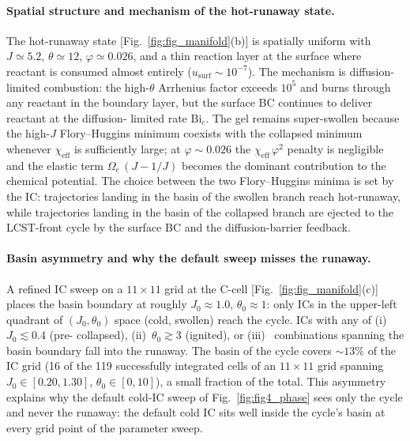 \documentclass[aps,pre,reprint,superscriptaddress,longbibliography,floatfix]{revtex4-2}
\newcommand{\Bi}{\mathrm{Bi}}
\begin{document}
\paragraph{Spatial structure and mechanism of the hot-runaway state.}
The hot-runaway state [Fig.~\ref{fig:fig_manifold}(b)] is spatially
uniform with $J\!\simeq\!5.2$, $\theta\!\simeq\!12$,
$\varphi\!\simeq\!0.026$, and a thin reaction layer at the surface
where reactant is consumed almost entirely
($u_\mathrm{surf}\!\sim\!10^{-7}$).  The mechanism is diffusion-
limited combustion: the high-$\theta$ Arrhenius factor exceeds
$10^5$ and burns through any reactant in the boundary layer, but
the surface BC continues to deliver reactant at the diffusion-
limited rate $\Bi_c$.  The gel remains super-swollen because the
high-$J$ Flory--Huggins minimum coexists with the collapsed minimum
whenever $\chi_\mathrm{eff}$ is sufficiently large; at
$\varphi\!\sim\!0.026$ the $\chi_\mathrm{eff}\,\varphi^2$ penalty is
negligible and the elastic term $\Omega_e\,(J-1/J)$ becomes the
dominant contribution to the chemical potential.  The choice
between the two Flory--Huggins minima is set by the IC: trajectories
landing in the basin of the swollen branch reach hot-runaway, while
trajectories landing in the basin of the collapsed branch are
ejected to the LCST-front cycle by the surface BC and the
diffusion-barrier feedback.

\paragraph{Basin asymmetry and why the default sweep misses the
runaway.}
A refined IC sweep on a $11\times 11$ grid at the C-cell
[Fig.~\ref{fig:fig_manifold}(c)] places the basin boundary at roughly
$J_0\!\approx\!1.0$, $\theta_0\!\approx\!1$: only ICs in the
upper-left quadrant of $(J_0, \theta_0)$ space (cold, swollen) reach
the cycle.  ICs with any of (i)~$J_0\!\lesssim\!0.4$ (pre-
collapsed), (ii)~$\theta_0\!\gtrsim\!3$ (ignited), or (iii)~
combinations spanning the basin boundary fall into the runaway.
The basin of the cycle covers $\sim\!13\%$ of the IC grid (16 of
the 119 successfully integrated cells of an $11\times 11$ grid
spanning $J_0\in[0.20, 1.30]$, $\theta_0\in[0,10]$), a small
fraction of the total.  This asymmetry explains why the default
cold-IC sweep of Fig.~\ref{fig:fig4_phase} sees only the cycle and
never the runaway: the default cold IC sits well inside the cycle's
basin at every grid point of the parameter sweep.
\end{document}
